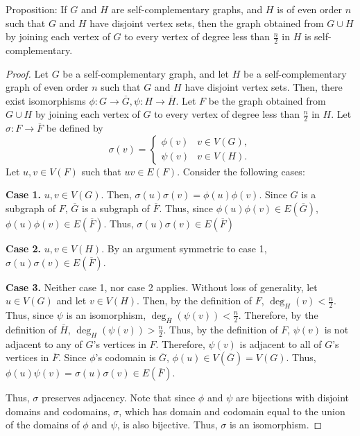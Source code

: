 \documentclass[12pt]{article}
\begin{document}
\newpage{} Proposition: If $G$ and $H$ are self-complementary graphs, and $H$ is of even order $n$ such that $G$ and $H$ have disjoint vertex sets, then the graph obtained from $G \cup H$ by joining each vertex of $G$ to every vertex of degree less than $\frac n2$ in $H$ is self-complementary.
\begin{proof}
    Let $G$ be a self-complementary graph, and let $H$ be a self-complementary graph of even order $n$ such that $G$ and $H$ have disjoint vertex sets.
    Then, there exist isomorphisms $\phi: G \to \overline G, \psi: H \to \overline H$.
    Let $F$ be the graph obtained from $G \cup H$ by joining each vertex of $G$ to every vertex of degree less than $\frac n2$ in $H$.
    Let $\sigma: F \to \overline F$ be defined by $$\sigma(v) = \begin{cases} \phi(v) & v \in V(G), \\ \psi(v) & v \in V(H). \end{cases}$$
    Let $u,v \in V(F)$ such that $uv \in E(F)$. Consider the following cases:

    {\bf Case 1.} $u,v \in V(G)$.
    Then, $\sigma(u)\sigma(v) = \phi(u)\phi(v)$.
    Since $G$ is a subgraph of $F$, $\overline G$ is a subgraph of $\overline F$.
    Thus, since $\phi(u)\phi(v) \in E( \overline G)$, $\phi(u)\phi(v) \in E(\overline F)$.
    Thus, $\sigma(u)\sigma(v) \in E(\overline F)$

    {\bf Case 2.} $u,v \in V(H)$.
    By an argument symmetric to case 1, $\sigma(u)\sigma(v) \in E(\overline F)$.

    {\bf Case 3.} Neither case 1, nor case 2 applies.
    Without loss of generality, let $u \in V(G)$ and let $v \in V(H)$.
    Then, by the definition of $F$, $\deg_H(v) < \frac n2$.
    Thus, since $\psi$ is an isomorphism, $\deg_{\overline H}(\psi(v)) < \frac n2$.
    Therefore, by the definition of $\overline H$, $\deg_H(\psi(v)) > \frac n2$.
    Thus, by the definition of $F$, $\psi(v)$ is not adjacent to any of $G$'s vertices in $F$.
    Therefore, $\psi(v)$ is adjacent to all of $G$'s vertices in $\overline F$.
    Since $\phi$'s codomain is $\overline G$, $\phi(u) \in V(\overline G) = V(G)$.
    Thus, $\phi(u)\psi(v) = \sigma(u)\sigma(v) \in E(\overline F)$.

    Thus, $\sigma$ preserves adjacency.
    Note that since $\phi$ and $\psi$ are bijections with disjoint domains and codomains, $\sigma$, which has domain and codomain equal to the union of the domains of $\phi$ and $\psi$, is also bijective.
    Thus, $\sigma$ is an isomorphism.
\end{proof}
\end{document}
